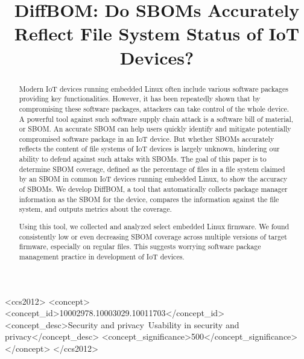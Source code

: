 \documentclass[sigconf, anonymous]{acmart}
\begin{document}
\title{DiffBOM: Do SBOMs Accurately Reflect File System Status of IoT Devices?} %

\begin{abstract}

Modern IoT devices running embedded Linux often include various software
    packages providing key functionalities. However, it has been repeatedly
    shown that by compromising these software packages, attackers can take
    control of the whole device. A powerful tool against such software supply
    chain attack is a software bill of material, or SBOM. An accurate SBOM can
    help users quickly identify and mitigate potentially compromised software
    package in an IoT device. But whether SBOMs accurately reflects the content
    of file systems of IoT devices is largely unknown, hindering our ability to defend against such attaks with SBOMs. The goal of this paper
    is to determine SBOM coverage, defined as the percentage of files in a file
    system claimed by an SBOM in common IoT devices running embedded Linux, to show the accuracy of SBOMs. We develop DiffBOM, a tool that automatically collects package manager
    information as the SBOM for the device, compares the information against
    the file system, and outputs metrics about the coverage.\par
Using this tool, we collected and analyzed select embedded Linux firmware. We found consistently low or even decreasing SBOM coverage across multiple versions of target firmware, especially on regular files. This suggests worrying software package management practice in development of IoT devices.
\end{abstract}

\begin{CCSXML}
<ccs2012>
<concept>
<concept_id>10002978.10003029.10011703</concept_id>
<concept_desc>Security and privacy~Usability in security and privacy</concept_desc>
<concept_significance>500</concept_significance>
</concept>
</ccs2012>
\end{CCSXML}



\maketitle



\end{document}
